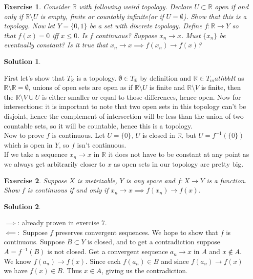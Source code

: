 \documentclass[11pt,a4paper]{article}
\newtheorem{Ex}{Exercise}
\newtheorem{Sol}{Solution}
\begin{document}
\begin{Ex}
	Consider $\mathbb{R}$ with following weird topology. Declare $U \subset \mathbb{R}$ open if and only if $\mathbb{R} \setminus U$ is empty, finite or countably infinite(or if $U = \emptyset$). Show that this is a topology. Now let $Y = \{0,1\}$ be a set with discrete topology. Define $f: \mathbb{R} \rightarrow Y$ so that $f(x) = 0$ iff $x \le 0$. Is $f$ continuous? Suppose $x_n \rightarrow x$. Must $\{x_n\}$ be eventually constant? Is it true that $x_n \rightarrow x \implies f(x_n) \rightarrow f(x)$? 
\end{Ex}

\begin{Sol} \end{Sol}
\noindent First let's show that $T_\mathbb{R}$ is a topology. $\emptyset \in T_\mathbb{R}$ by definition and $\mathbb{R} \in T_mathbb{R}$ as $\mathbb{R} \setminus \mathbb{R} = \emptyset$, unions of open sets are open as if $\mathbb{R} \setminus U$ is finite and $\mathbb{R} \setminus V$ is finite, then the $\mathbb{R} \setminus V \cup U$ is either smaller or equal to those differences, hence open. Now for intersections: it is important to note that two open sets in this topology can't be disjoint, hence the complement of intersection will be less than the union of two countable sets, so it will be countable, hence this is a topology.\\ 
Now to prove $f$ is continuous. Let $U = \{0\}$, $U$ is closed in $\mathbb{R}$, but $U = f^{-1}(\{0\})$ which is open in $Y$, so $f$ isn't continuous. \\
If we take a sequence $x_n \rightarrow x$ in $\mathbb{R}$ it does not have to be constant at any point as we always get arbitrarily closer to $x$ as open sets in our topology are pretty big. 

\begin{Ex}
	Suppose $X$ is metrizable, $Y$ is any space and $f: X \rightarrow Y$ is a function. Show $f$ is continuous if and only if $x_n \rightarrow x \implies f(x_n) \rightarrow f(x)$.
\end{Ex}

\begin{Sol} \end{Sol}
\noindent $\implies$: already proven in exercise 7. \\
$\impliedby:$ Suppose $f$ preserves convergent sequences. We hope to show that $f$ is continuous. Suppose $B \subset Y$ is closed, and to get a contradiction suppose $A = f^{-1}(B)$ is not closed. Get a convergent sequence $a_n \rightarrow x$ in $A$ and $x \not\in A$. We know $f(a_n) \rightarrow f(x)$. Since each $f(a_n) \in B$ and since $f(a_n) \rightarrow f(x)$ we have $f(x) \in B$. Thus $x\in A$, giving us the contradiction. 
\end{document}
